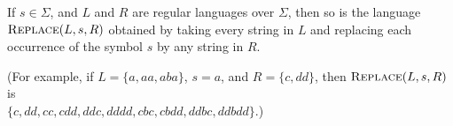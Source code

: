 \documentclass[11pt]{article}
\begin{document}
\begin{qunlist}
\begin{qparts}
\item
If $s \in \Sigma$, and $L$ and $R$ are regular languages over $\Sigma$, then so is the language $\textsc{Replace}(L, s, R)$ obtained by taking every string in $L$ and replacing each occurrence of the symbol $s$ by any string in $R$.

(For example, if $L = \{ a, aa, aba \}$, $s = a$, and $R = \{ c, dd \}$, then $\textsc{Replace}(L, s, R)$ is \\$\{ c, dd, cc, cdd, ddc, dddd, cbc, cbdd, ddbc, ddbdd \}$.)
\end{qparts}


\end{qunlist}
\end{document}
